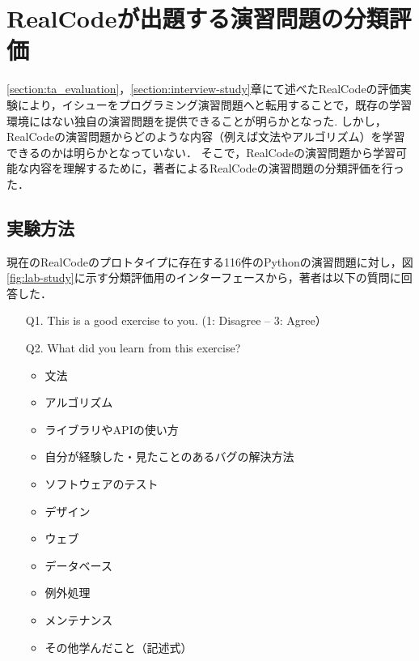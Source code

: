 
\chapter{RealCodeが出題する演習問題の分類評価}
\label{section:lab-study}
\graphicspath{{Chapters_evaluation/Figs/}}


\ref{section:ta_evaluation}，\ref{section:interview-study}章にて述べたRealCodeの評価実験により，イシューをプログラミング演習問題へと転用することで，既存の学習環境にはない独自の演習問題を提供できることが明らかとなった.
しかし，RealCodeの演習問題からどのような内容（例えば文法やアルゴリズム）を学習できるのかは明らかとなっていない．
そこで，RealCodeの演習問題から学習可能な内容を理解するために，著者によるRealCodeの演習問題の分類評価を行った．


\section{実験方法}

現在のRealCodeのプロトタイプに存在する116件のPythonの演習問題に対し，図\ref{fig:lab-study}に示す分類評価用のインターフェースから，著者は以下の質問に回答した．

\begin{itemize}
  \item[Q1.] This is a good exercise to you. (1: Disagree -- 3: Agree）
  \item[Q2.] What did you learn from this exercise?
  \begin{itemize}
  	  \item 文法
   	  \item アルゴリズム
      \item ライブラリやAPIの使い方
      \item 自分が経験した・見たことのあるバグの解決方法
      \item ソフトウェアのテスト
      \item デザイン
      \item ウェブ
      \item データベース
      \item 例外処理
      \item メンテナンス
      \item その他学んだこと（記述式）
  \end{itemize}
\end{itemize}

